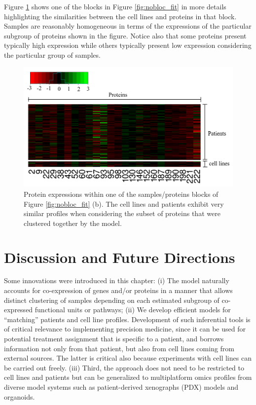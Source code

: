 Figure \ref{fig:match_patients_cell_lines} shows one of the blocks in Figure \ref{fig:nobloc_fit} in more details highlighting the similarities between the cell lines and proteins in that block. Samples are reasonably homogeneous in terms of the expressions of the particular subgroup of proteins shown in the figure. Notice also that some proteins present typically high expression while others typically present low expression considering the particular group of samples.


\begin{figure}[H]
\centering
\includegraphics[scale=0.5]{./veera/zoom_after_poe_new.png}
\caption{Protein expressions within one of the samples/proteins blocks of Figure \ref{fig:nobloc_fit} (b). The cell lines and patients exhibit very similar profiles when considering the subset of proteins that were clustered together by the model.}
\label{fig:match_patients_cell_lines}
\end{figure} 

\section{Discussion and Future Directions}

Some innovations were introduced in this chapter: (i) The model naturally accounts for co-expression of genes and/or proteins in a manner that allows distinct clustering of samples depending on each estimated subgroup of co-expressed functional units or pathways; (ii) We develop efficient models for “matching” patients and cell line profiles. Development of such inferential tools is of critical relevance to implementing precision medicine, since it can be used for potential treatment assignment that is specific to a patient, and borrows information not only from that patient, but also from cell lines coming from external sources. The latter is critical also because experiments with cell lines can be carried out freely. (iii) Third, the approach does not need to be restricted to cell lines and patients but can be generalized to multiplatform omics profiles from diverse model systems such as patient-derived xenographs (PDX) models and organoids.

